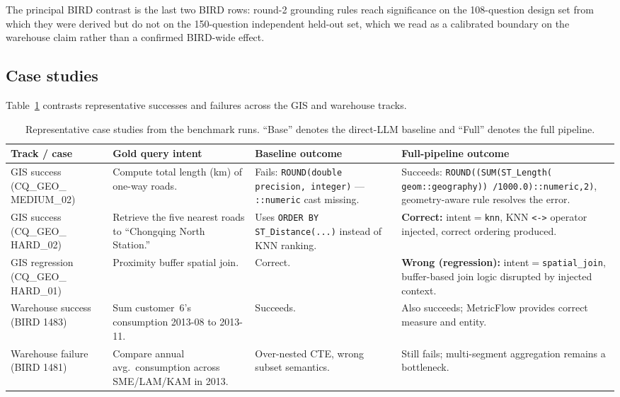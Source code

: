 \documentclass[11pt]{article}
\begin{document}
The principal BIRD contrast is the last two BIRD rows: round-2 grounding rules reach significance on the 108-question design set from which they were derived but do not on the 150-question independent held-out set, which we read as a calibrated boundary on the warehouse claim rather than a confirmed BIRD-wide effect.

\subsection{Case studies}

Table~\ref{tab:case} contrasts representative successes and failures across the GIS and warehouse tracks.

\begin{table}[p]
\centering
\scriptsize
\caption{Representative case studies from the benchmark runs. ``Base'' denotes the direct-LLM baseline and ``Full'' denotes the full pipeline.}
\label{tab:case}
\begin{tabular}{p{1.8cm} p{2.8cm} p{4.2cm} p{4.2cm}}
\toprule
Track / case & Gold query intent & Baseline outcome & Full-pipeline outcome \\
\midrule
GIS success (CQ\_GEO\_ MEDIUM\_02) & Compute total length (km) of one-way roads. & Fails: \texttt{ROUND(double precision, integer)} — \texttt{::numeric} cast missing. & Succeeds: \texttt{ROUND((SUM(ST\_Length( geom::geography)) /1000.0)::numeric,2)}, geometry-aware rule resolves the error. \\
\midrule
GIS success (CQ\_GEO\_ HARD\_02) & Retrieve the five nearest roads to ``Chongqing North Station.'' & Uses \texttt{ORDER BY ST\_Distance(...)} instead of KNN ranking. & \textbf{Correct:} intent$=$\texttt{knn}, KNN \texttt{<->} operator injected, correct ordering produced. \\
\midrule
GIS regression (CQ\_GEO\_ HARD\_01) & Proximity buffer spatial join. & Correct. & \textbf{Wrong (regression):} intent$=$\texttt{spatial\_join}, buffer-based join logic disrupted by injected context. \\
\midrule
Warehouse success (BIRD 1483) & Sum customer~6's consumption 2013-08 to 2013-11. & Succeeds. & Also succeeds; MetricFlow provides correct measure and entity. \\
\midrule
Warehouse failure (BIRD 1481) & Compare annual avg.\ consumption across SME/LAM/KAM in 2013. & Over-nested CTE, wrong subset semantics. & Still fails; multi-segment aggregation remains a bottleneck. \\
\bottomrule
\end{tabular}
\end{table}
\end{document}
